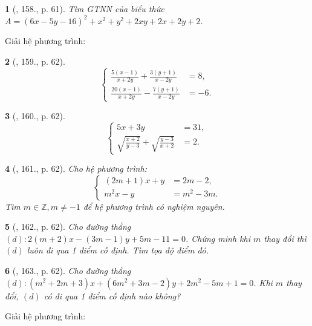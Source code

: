 \documentclass{article}
\newtheorem{baitoan}{}
\begin{document}
\begin{baitoan}[\cite{Tuyen_Toan_9_old}, 158., p. 61]
	Tìm {\rm GTNN} của biểu thức $A = (6x - 5y - 16)^2 + x^2 + y^2 + 2xy + 2x + 2y + 2$.
\end{baitoan}
Giải hệ phương trình:

\begin{baitoan}[\cite{Tuyen_Toan_9_old}, 159., p. 62]
	\begin{equation*}
		\left\{\begin{split}
			\frac{5(x - 1)}{x + 2y} + \frac{3(y + 1)}{x - 2y} &= 8,\\
			\frac{20(x - 1)}{x + 2y} - \frac{7(y + 1)}{x - 2y} &= -6.
		\end{split}\right.
	\end{equation*}
\end{baitoan}

\begin{baitoan}[\cite{Tuyen_Toan_9_old}, 160., p. 62]
	\begin{equation*}
		\left\{\begin{split}
			5x + 3y &= 31,\\
			\sqrt{\frac{x + 2}{y - 3}} + \sqrt{\frac{y - 3}{x + 2}} &= 2.
		\end{split}\right.
	\end{equation*}
\end{baitoan}

\begin{baitoan}[\cite{Tuyen_Toan_9_old}, 161., p. 62]
	Cho hệ phương trình:
	\begin{equation*}
		\left\{\begin{split}
			(2m + 1)x + y &= 2m - 2,\\
			m^2x - y &= m^2 - 3m.
		\end{split}\right.
	\end{equation*}
	Tìm $m\in\mathbb{Z},m\ne-1$ để hệ phương trình có nghiệm nguyên.
\end{baitoan}

\begin{baitoan}[\cite{Tuyen_Toan_9_old}, 162., p. 62]
	Cho đường thẳng $(d):2(m + 2)x - (3m - 1)y + 5m - 11 = 0$. Chứng minh khi $m$ thay đổi thì $(d)$ luôn đi qua 1 điểm cố định. Tìm tọa độ điểm đó.
\end{baitoan}

\begin{baitoan}[\cite{Tuyen_Toan_9_old}, 163., p. 62]
	Cho đường thẳng $(d):(m^2 + 2m + 3)x + (6m^2 + 3m - 2)y + 2m^2 - 5m + 1 = 0$. Khi $m$ thay đổi, $(d)$ có đi qua 1 điểm cố định nào không?
\end{baitoan}
Giải hệ phương trình:
\end{document}
